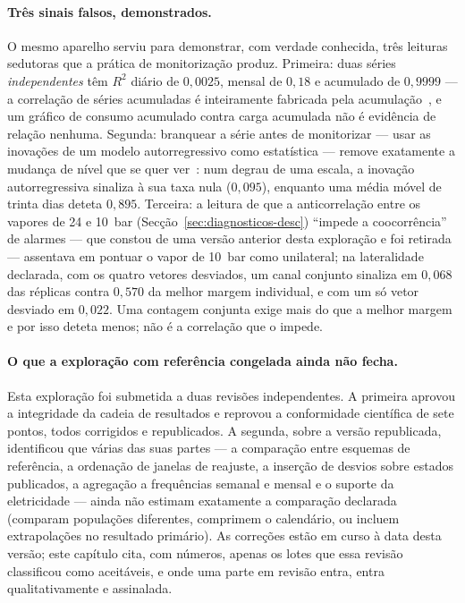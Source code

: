 \paragraph{Três sinais falsos, demonstrados.} O mesmo aparelho serviu para
demonstrar, com verdade conhecida, três leituras sedutoras que a prática de
monitorização produz. Primeira: duas séries \emph{independentes} têm $R^2$
diário de $0{,}0025$, mensal de $0{,}18$ e acumulado de $0{,}9999$ --- a
correlação de séries acumuladas é inteiramente fabricada pela
acumulação~\cite{Yule1926,GrangerNewbold1974}, e
um gráfico de consumo acumulado contra carga acumulada não é evidência de
relação nenhuma. Segunda: branquear a série antes de monitorizar --- usar as
inovações de um modelo autorregressivo como estatística --- remove
exatamente a mudança de nível que se quer ver~\cite{AlwanRoberts1988,Wardell1994}: num degrau de uma escala, a
inovação autorregressiva sinaliza à sua taxa nula ($0{,}095$), enquanto uma
média móvel de trinta dias deteta $0{,}895$. Terceira: a leitura de que a
anticorrelação entre os vapores de 24 e 10~bar
(Secção~\ref{sec:diagnosticos-desc}) ``impede a coocorrência'' de alarmes ---
que constou de uma versão anterior desta exploração e foi retirada ---
assentava em pontuar o vapor de 10~bar como unilateral; na lateralidade
declarada, com os quatro vetores desviados, um canal conjunto sinaliza em
$0{,}068$ das réplicas contra $0{,}570$ da melhor margem individual, e com um
só vetor desviado em $0{,}022$. Uma contagem conjunta exige mais do que a
melhor margem e por isso deteta menos; não é a correlação que o impede.

\paragraph{O que a exploração com referência congelada ainda não fecha.}
Esta exploração foi submetida a duas revisões independentes. A primeira
aprovou a integridade da cadeia de resultados e reprovou a conformidade
científica de sete pontos, todos corrigidos e republicados. A segunda,
sobre a versão republicada, identificou que várias das suas partes --- a
comparação entre esquemas de referência, a ordenação de janelas de
reajuste, a inserção de desvios sobre estados publicados, a agregação a
frequências semanal e mensal e o suporte da eletricidade --- ainda não
estimam exatamente a comparação declarada (comparam populações diferentes,
comprimem o calendário, ou incluem extrapolações no resultado primário). As
correções estão em curso à data desta versão; este capítulo cita, com
números, apenas os lotes que essa revisão classificou como aceitáveis, e
onde uma parte em revisão entra, entra qualitativamente e assinalada.

